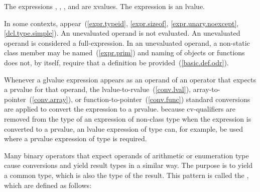 The expressions , , , and 
are xvalues. The expression  is an lvalue.
\exitexample

\pnum
In some contexts, 
appear~(\ref{expr.typeid}, \ref{expr.sizeof}, \ref{expr.unary.noexcept}, \ref{dcl.type.simple}).
An unevaluated operand is not evaluated. An unevaluated operand is
considered a full-expression.
\enternote
In an unevaluated operand, a non-static class member may be
named~(\ref{expr.prim}) and naming of objects or functions does not, by
itself, require that a definition be provided~(\ref{basic.def.odr}).
\exitnote

\pnum
Whenever a glvalue expression appears as an operand of an operator that
expects a prvalue for that operand, the
lvalue-to-rvalue~(\ref{conv.lval}), array-to-pointer~(\ref{conv.array}),
or function-to-pointer~(\ref{conv.func}) standard conversions are
applied to convert the expression to a prvalue.
\enternote 
because cv-qualifiers are removed from the type of an expression of
non-class type when the expression is converted to a prvalue, an lvalue
expression of type  can, for example, be used where
a prvalue expression of type  is required.
\exitnote 

\pnum
{}%
Many binary operators that expect operands of arithmetic or enumeration
type cause conversions and yield result types in a similar way. The
purpose is to yield a common type, which is also the type of the result.
This pattern is called the ,
which are defined as follows:

